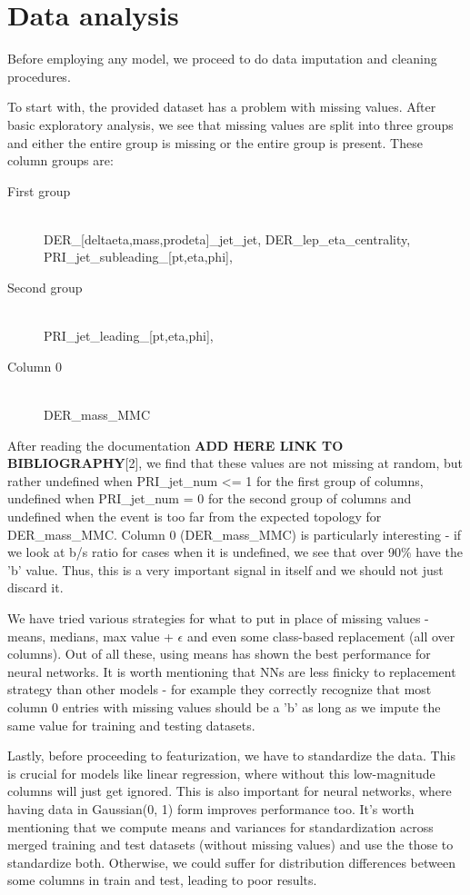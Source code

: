 \documentclass[10pt,conference,compsocconf]{IEEEtran}
\begin{document}
\section{Data analysis}
Before employing any model, we proceed to do data imputation and cleaning procedures.

To start with, the provided dataset has a problem with missing values. After basic exploratory analysis, we see that missing values are split into three groups and either the entire group is missing or the entire group is present. These column groups are:
\begin{description}
	\item[First group] \ \\
	DER\_[deltaeta,mass,prodeta]\_jet\_jet, DER\_lep\_eta\_centrality, PRI\_jet\_subleading\_[pt,eta,phi],
	\item[Second group] \ \\
	PRI\_jet\_leading\_[pt,eta,phi],
	\item[Column 0] \ \\
	DER\_mass\_MMC
\end{description}
After reading the documentation \textbf{ADD HERE LINK TO BIBLIOGRAPHY}[2], we find that these values are not missing at random, but rather undefined when PRI\_jet\_num <= 1 for the first group of columns, undefined when PRI\_jet\_num = 0 for the second group of columns and undefined when the event is too far from the expected topology for DER\_mass\_MMC. Column 0 (DER\_mass\_MMC) is particularly interesting - if we look at b/s ratio for cases when it is undefined, we see that over 90\% have the 'b' value. Thus, this is a very important signal in itself and we should not just discard it.
  
We have tried various strategies for what to put in place of missing values - means, medians, max value + $\epsilon$ and even some class-based replacement (all over columns). Out of all these, using means has shown the best performance for neural networks. It is worth mentioning that NNs are less finicky to replacement strategy than other models - for example they correctly recognize that most column 0 entries with missing values should be a 'b' as long as we impute the same value for training and testing datasets.

Lastly, before proceeding to featurization, we have to standardize the data. This is crucial for models like linear regression, where without this low-magnitude columns will just get ignored. This is also important for neural networks, where having data in Gaussian(0, 1) form improves performance too. It's worth mentioning that we compute means and variances for standardization across merged training and test datasets (without missing values) and use the those to standardize both. Otherwise, we could suffer for distribution differences between some columns in train and test, leading to poor results.
\end{document}
